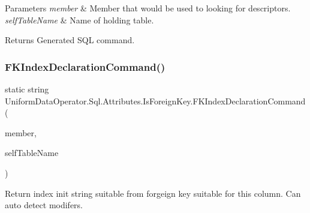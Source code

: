 \begin{DoxyParams}{Parameters}
{\em member} & Member that would be used to looking for descriptors.\\
\hline
{\em self\+Table\+Name} & Name of holding table.\\
\hline
\end{DoxyParams}
\begin{DoxyReturn}{Returns}
Generated S\+QL command.
\end{DoxyReturn}
\mbox{\label{class_uniform_data_operator_1_1_sql_1_1_attributes_1_1_is_foreign_key_a8d5c79de848dd87916ab946972db0188}} 
\subsubsection{\texorpdfstring{F\+K\+Index\+Declaration\+Command()}{FKIndexDeclarationCommand()}\hspace{0.1cm}{\footnotesize\ttfamily [1/2]}}
{\footnotesize\ttfamily static string Uniform\+Data\+Operator.\+Sql.\+Attributes.\+Is\+Foreign\+Key.\+F\+K\+Index\+Declaration\+Command (\begin{DoxyParamCaption}\item[{Member\+Info}]{member,  }\item[{string}]{self\+Table\+Name }\end{DoxyParamCaption})\hspace{0.3cm}{\ttfamily [static]}}



Return index init string suitable from forgeign key suitable for this column. Can auto detect modifers. 


